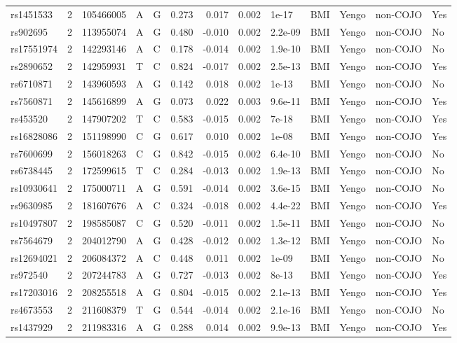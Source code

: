 \documentclass[11pt,twoside]{bristolthesis}
\begin{document}
\begin{longtable}[t]{lrlllrrrlllll}
rs1451533 & 2 & 105466005 & A & G & 0.273 & 0.017 & 0.002 & 1e-17 & BMI & Yengo & non-COJO & Yes\\
\addlinespace
rs902695 & 2 & 113955074 & A & G & 0.480 & -0.010 & 0.002 & 2.2e-09 & BMI & Yengo & non-COJO & No\\
rs17551974 & 2 & 142293146 & A & C & 0.178 & -0.014 & 0.002 & 1.9e-10 & BMI & Yengo & non-COJO & No\\
rs2890652 & 2 & 142959931 & T & C & 0.824 & -0.017 & 0.002 & 2.5e-13 & BMI & Yengo & non-COJO & Yes\\
rs6710871 & 2 & 143960593 & A & G & 0.142 & 0.018 & 0.002 & 1e-13 & BMI & Yengo & non-COJO & No\\
rs7560871 & 2 & 145616899 & A & G & 0.073 & 0.022 & 0.003 & 9.6e-11 & BMI & Yengo & non-COJO & Yes\\
\addlinespace
rs453520 & 2 & 147907202 & T & C & 0.583 & -0.015 & 0.002 & 7e-18 & BMI & Yengo & non-COJO & Yes\\
rs16828086 & 2 & 151198990 & C & G & 0.617 & 0.010 & 0.002 & 1e-08 & BMI & Yengo & non-COJO & Yes\\
rs7600699 & 2 & 156018263 & C & G & 0.842 & -0.015 & 0.002 & 6.4e-10 & BMI & Yengo & non-COJO & No\\
rs6738445 & 2 & 172599615 & T & C & 0.284 & -0.013 & 0.002 & 1.9e-13 & BMI & Yengo & non-COJO & No\\
rs10930641 & 2 & 175000711 & A & G & 0.591 & -0.014 & 0.002 & 3.6e-15 & BMI & Yengo & non-COJO & No\\
\addlinespace
rs9630985 & 2 & 181607676 & A & C & 0.324 & -0.018 & 0.002 & 4.4e-22 & BMI & Yengo & non-COJO & Yes\\
rs10497807 & 2 & 198585087 & C & G & 0.520 & -0.011 & 0.002 & 1.5e-11 & BMI & Yengo & non-COJO & No\\
rs7564679 & 2 & 204012790 & A & G & 0.428 & -0.012 & 0.002 & 1.3e-12 & BMI & Yengo & non-COJO & No\\
rs12694021 & 2 & 206084372 & A & C & 0.448 & 0.011 & 0.002 & 1e-09 & BMI & Yengo & non-COJO & No\\
rs972540 & 2 & 207244783 & A & G & 0.727 & -0.013 & 0.002 & 8e-13 & BMI & Yengo & non-COJO & Yes\\
\addlinespace
rs17203016 & 2 & 208255518 & A & G & 0.804 & -0.015 & 0.002 & 2.1e-13 & BMI & Yengo & non-COJO & Yes\\
rs4673553 & 2 & 211608379 & T & G & 0.544 & -0.014 & 0.002 & 2.1e-16 & BMI & Yengo & non-COJO & No\\
rs1437929 & 2 & 211983316 & A & G & 0.288 & 0.014 & 0.002 & 9.9e-13 & BMI & Yengo & non-COJO & Yes\\

\end{longtable}
\end{document}

